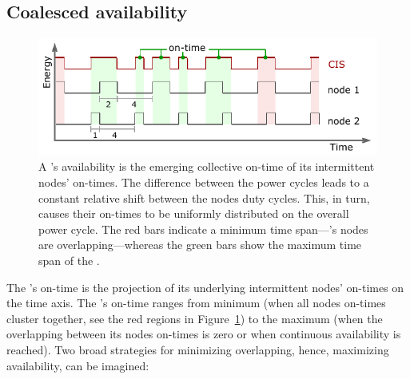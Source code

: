\subsection{Coalesced availability}
\label{subSec:availability}
%
\begin{figure}[t]
		\centering
		\includegraphics[width=\columnwidth]{figures/cisOntime}
		\caption{A \fullsys's availability is the emerging collective on-time of its intermittent nodes' on-times. The difference between the power cycles leads to a constant relative shift between the nodes duty cycles. This, in turn, causes their on-times to be uniformly distributed on the overall power cycle. The red bars indicate a minimum \sys time span---\sys's nodes are overlapping---whereas the green bars show the maximum time span of the \sys.}
		\label{fig:cisOntime}
\end{figure} 
%
The \sys's on-time is the projection of its underlying intermittent nodes' on-times on the time axis. The \sys's on-time ranges from minimum (when all nodes on-times cluster together, see the red regions in Figure~\ref{fig:cisOntime}) to the maximum (when the overlapping between its nodes on-times is zero or when continuous availability is reached). Two broad strategies for minimizing overlapping, hence, maximizing \sys availability, can be imagined: 
